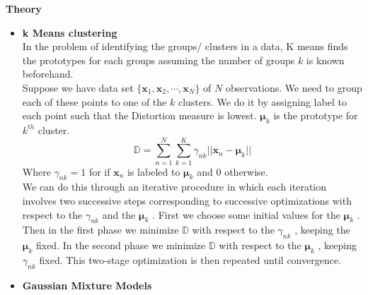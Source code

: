 \documentclass[11pt,paper=a4,answers]{exam}
\renewcommand{\vec}[1]{\mathbf{#1}}
\begin{document}
\begin{questions}
\question \textbf{Theory}
\begin{itemize}
    \item \textbf{k Means clustering}\\
    In the problem of identifying the groups/ clusters in a data, K means finds the prototypes for each groups assuming the number of groups $k$ is known beforehand.\\
    Suppose we have data set $\{\vec{x}_1, \vec{x}_2, \cdots, \vec{x}_N\}$ of $N$ observations. We need to group each of these points to one of the $k$ clusters. We do it by assigning label to each point such that the Distortion measure is lowest. $\bm{\mu}_k$ is the prototype for $k^{th}$ cluster.
    $$\mathbb{D} = \sum_{n=1}^N \sum_{k=1}^K \gamma_{nk}|| \vec{x}_n - \bm{\mu}_k||$$
    Where $\gamma_{nk} = 1$ for if $\vec{x}_n$ is labeled to $\bm{\mu}_k$ and $0$ otherwise.\\
    We can do this through an iterative procedure in which each iteration involves two successive steps corresponding to successive optimizations with respect to the $\gamma_{nk}$ and the $\bm{\mu}_k$ . First we choose some initial values for the $\bm{\mu}_k$ . Then in the first phase we minimize $\mathbb{D}$ with respect to the $\gamma_{nk}$ , keeping the $\bm{\mu}_k$ fixed. In the second phase we minimize $\mathbb{D}$ with respect to the $\bm{\mu}_k$ , keeping $\gamma_{nk}$ fixed. This two-stage optimization is then repeated until convergence.

    \item \textbf{Gaussian Mixture Models}\\

\end{itemize}


\end{questions}
\end{document}

